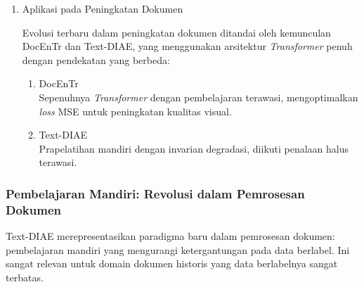 \begin{enumerate}[leftmargin=*, labelindent=0pt, itemsep=1ex, topsep=0pt]

\item Aplikasi pada Peningkatan Dokumen

Evolusi terbaru dalam peningkatan dokumen ditandai oleh kemunculan DocEnTr dan Text-DIAE, yang menggunakan arsitektur \textit{Transformer} penuh dengan pendekatan yang berbeda:
\begin{enumerate}[leftmargin=1.5em, labelsep=0.5em, itemindent=0pt, label=\alph*., topsep=0pt, parsep=0pt, itemsep=0pt]
      \item DocEnTr \mbox{}\\[0.1em]
            Sepenuhnya \textit{Transformer} dengan pembelajaran terawasi, mengoptimalkan \textit{loss} MSE untuk peningkatan kualitas visual.
      \item Text-DIAE \mbox{}\\[0.1em]
            Prapelatihan mandiri dengan invarian degradasi, diikuti penalaan halus terawasi.
\end{enumerate}

\end{enumerate}

\subsubsection{Pembelajaran Mandiri: Revolusi dalam Pemrosesan Dokumen}
\label{subsubsec:pembelajaran-mandiri}

Text-DIAE merepresentasikan paradigma baru dalam pemrosesan dokumen: pembelajaran mandiri yang mengurangi ketergantungan pada data berlabel. Ini sangat relevan untuk domain dokumen historis yang data berlabelnya sangat terbatas.

